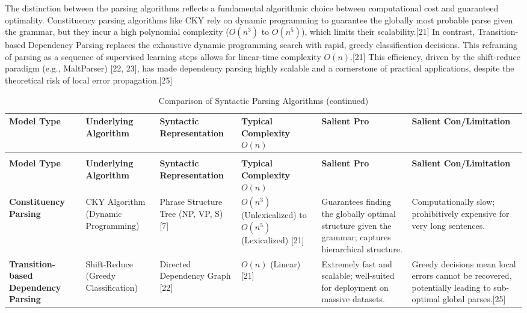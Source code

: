 \documentclass{article}
\begin{document}
The distinction between the parsing algorithms reflects a fundamental algorithmic choice between computational cost and guaranteed optimality. Constituency parsing algorithms like CKY rely on dynamic programming to guarantee the globally most probable parse given the grammar, but they incur a high polynomial complexity ($O(n^3)$ to $O(n^5)$), which limits their scalability.[21] In contrast, Transition-based Dependency Parsing replaces the exhaustive dynamic programming search with rapid, greedy classification decisions. This reframing of parsing as a sequence of supervised learning steps allows for linear-time complexity $O(n)$.[21] This efficiency, driven by the shift-reduce paradigm (e.g., MaltParser) [22, 23], has made dependency parsing highly scalable and a cornerstone of practical applications, despite the theoretical risk of local error propagation.[25]

\begin{longtable}{|p{2.3cm}|p{2.8cm}|p{2.2cm}|p{2.3cm}|p{3.0cm}|p{3.0cm}|}
\caption{Comparison of Syntactic Parsing Algorithms}
\label{tab:parsing_comparison} \\
\toprule
\textbf{Model Type} & \textbf{Underlying Algorithm} & \textbf{Syntactic Representation} & \textbf{Typical Complexity $O(n)$} & \textbf{Salient Pro} & \textbf{Salient Con/Limitation} \\
\midrule
\endfirsthead
\caption{Comparison of Syntactic Parsing Algorithms (continued)} \\
\toprule
\textbf{Model Type} & \textbf{Underlying Algorithm} & \textbf{Syntactic Representation} & \textbf{Typical Complexity $O(n)$} & \textbf{Salient Pro} & \textbf{Salient Con/Limitation} \\
\midrule
\endhead
\bottomrule
\endfoot
\bottomrule
\endlastfoot
\textbf{Constituency Parsing} & CKY Algorithm (Dynamic Programming) & Phrase Structure Tree (NP, VP, S) [7] & $O(n^3)$ (Unlexicalized) to $O(n^5)$ (Lexicalized) [21] & Guarantees finding the globally optimal structure given the grammar; captures hierarchical structure. & Computationally slow; prohibitively expensive for very long sentences. \\
\hline
\textbf{Transition-based Dependency Parsing} & Shift-Reduce (Greedy Classification) & Directed Dependency Graph [22] & $O(n)$ (Linear) [21] & Extremely fast and scalable; well-suited for deployment on massive datasets. & Greedy decisions mean local errors cannot be recovered, potentially leading to sub-optimal global parses.[25] \\
\hline
\end{longtable}
\end{document}
